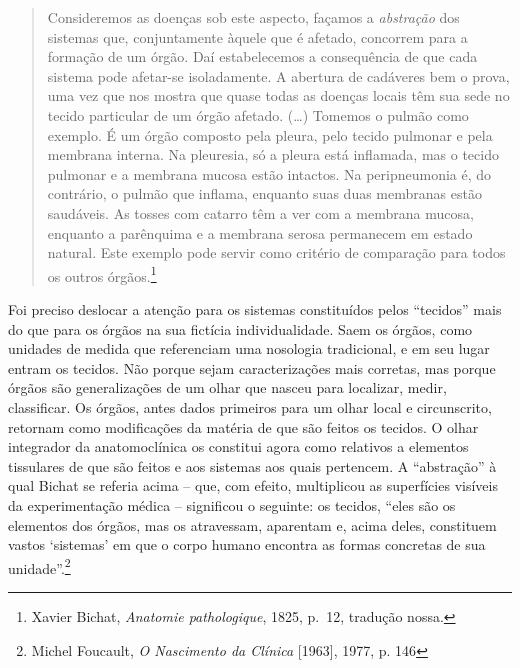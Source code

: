 \begin{quote}
Consideremos as doenças sob este aspecto, façamos a \emph{abstração} dos
sistemas que, conjuntamente àquele que é afetado, concorrem para a
formação de um órgão. Daí estabelecemos a consequência de que cada
sistema pode afetar-se isoladamente. A abertura de cadáveres bem o
prova, uma vez que nos mostra que quase todas as doenças locais têm sua
sede no tecido particular de um órgão afetado. (\ldots{}) Tomemos o
pulmão como exemplo. É um órgão composto pela pleura, pelo tecido
pulmonar e pela membrana interna. Na pleuresia, só a pleura está
inflamada, mas o tecido pulmonar e a membrana mucosa estão intactos. Na
peripneumonia é, do contrário, o pulmão que inflama, enquanto suas duas
membranas estão saudáveis. As tosses com catarro têm a ver com a
membrana mucosa, enquanto a parênquima e a membrana serosa permanecem em
estado natural. Este exemplo pode servir como critério de comparação
para todos os outros órgãos.\footnote{Xavier Bichat, \emph{Anatomie
  pathologique}, 1825, p.~12, tradução nossa.}
\end{quote}

Foi preciso deslocar a atenção para os sistemas constituídos pelos
``tecidos'' mais do que para os órgãos na sua fictícia individualidade.
Saem os órgãos, como unidades de medida que referenciam uma nosologia
tradicional, e em seu lugar entram os tecidos. Não porque sejam
caracterizações mais corretas, mas porque órgãos são generalizações de
um olhar que nasceu para localizar, medir, classificar. Os órgãos, antes
dados primeiros para um olhar local e circunscrito, retornam como
modificações da matéria de que são feitos os tecidos. O olhar integrador
da anatomoclínica os constitui agora como relativos a elementos
tissulares de que são feitos e aos sistemas aos quais pertencem. A
``abstração'' à qual Bichat se referia acima -- que, com efeito,
multiplicou as superfícies visíveis da experimentação médica --
significou o seguinte: os tecidos, ``eles são os elementos dos órgãos,
mas os atravessam, aparentam e, acima deles, constituem vastos
`sistemas' em que o corpo humano encontra as formas concretas de sua
unidade''.\footnote{Michel Foucault, \emph{O Nascimento da Clínica}
  {[}1963{]}, 1977, p. 146}

